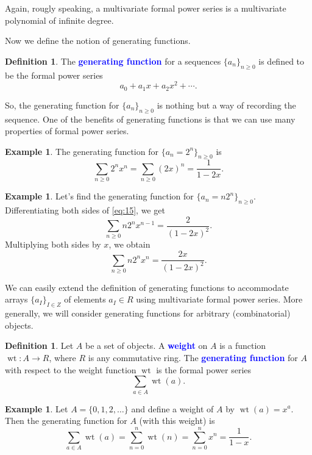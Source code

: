 \documentclass[oneside]{book}
\numberwithin{equation}{section}
\theoremstyle{definition}
\newtheorem{exam}[thm]{Example}
\newtheorem{defn}[thm]{Definition}
\newcommand\wt{\operatorname{wt}}
\renewcommand\emph[1]{\textcolor{blue}{\bf #1}}
\begin{document}
Again, rougly speaking, a multivariate formal power series is a
multivariate polynomial of infinite degree.


Now we define the notion of generating functions.


\begin{defn}
  The \emph{generating function} for a sequences \( \{ a_n\}_{n\ge 0} \) is
  defined to be the formal power series
\[
  a_0 + a_1 x + a_2 x^2 + \cdots.
\]
\end{defn}

So, the generating function for \( \{ a_n\}_{n\ge 0} \) is nothing but
a way of recording the sequence. One of the benefits of generating
functions is that we can use many properties of formal power series.


\begin{exam}
  The generating function for \( \{ a_n = 2^n\}_{n\ge 0} \) is
  \begin{equation}\label{eq:15}
    \sum_{n\ge 0} 2^n x^n = \sum_{n\ge 0} (2x)^n = \frac{1}{1-2x}.
  \end{equation}
\end{exam}

\begin{exam}
  Let's find the generating function for \( \{ a_n = n 2^n\}_{n\ge 0} \).
  Differentiating both sides of \eqref{eq:15}, we get
  \[
    \sum_{n\ge 0} n2^n x^{n-1} =  \frac{2}{(1-2x)^2}.
  \]
  Multiplying both sides by \( x \), we obtain
  \[
    \sum_{n\ge 0} n2^n x^{n} =  \frac{2x}{(1-2x)^2}.
  \]
\end{exam}

We can easily extend the definition of generating functions to
accommodate arrays \( \{ a_I\}_{I\in Z} \) of elements \( a_I\in R \)
using multivariate formal power series. More generally, we will
consider generating functions for arbitrary (combinatorial) objects.

\begin{defn}
  Let \( A \) be a set of objects. A \emph{weight} on \( A \) is a
  function \( \wt:A\to R \), where \( R \) is any commutative ring.
  The \emph{generating function} for \( A \) with respect to the
  weight function \( \wt \) is the formal power series
  \[
    \sum_{a \in A} \wt(a).
  \]
\end{defn}



\begin{exam}
  Let \( A = \{0,1,2,\dots\} \) and define a weight of \( A \) by
  \( \wt(a) = x^a \). Then the generating function for \( A \)
  (with this weight) is
  \[
    \sum_{a \in A} \wt(a) = \sum_{n=0}^n \wt(n)
    = \sum_{n=0}^n x^n = \frac{1}{1-x}.
  \]
\end{exam}
\end{document}
